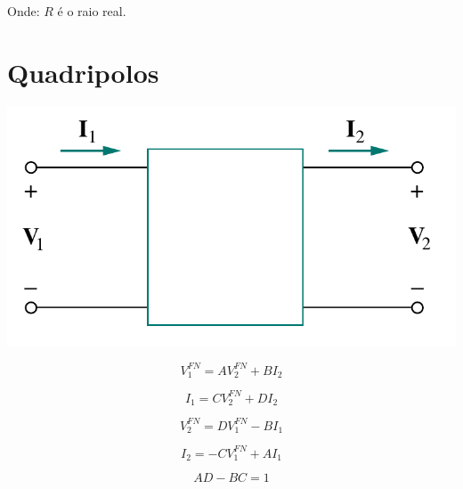 \documentclass[conference]{IEEEtran}
\begin{document}

Onde: $R$ é o raio real.


\section{\textbf{Quadripolos}}

\begin{center}
    \includegraphics[scale=0.3]{Two-port_parameters.png}
\end{center}

\begin{equation}
    V_1^{FN} = A V_2^{FN} + B I_2
\end{equation}

\begin{equation}
I_1 = C V_2^{FN}  + D I_2
\end{equation}

\begin{equation}
V_2^{FN}  = D V_1^{FN}  - B I_1
\end{equation}

\begin{equation}
I_2 = - C V_1^{FN}  + A I_1
\end{equation}

\begin{equation}
A D - B C = 1
\end{equation}

\end{document}
